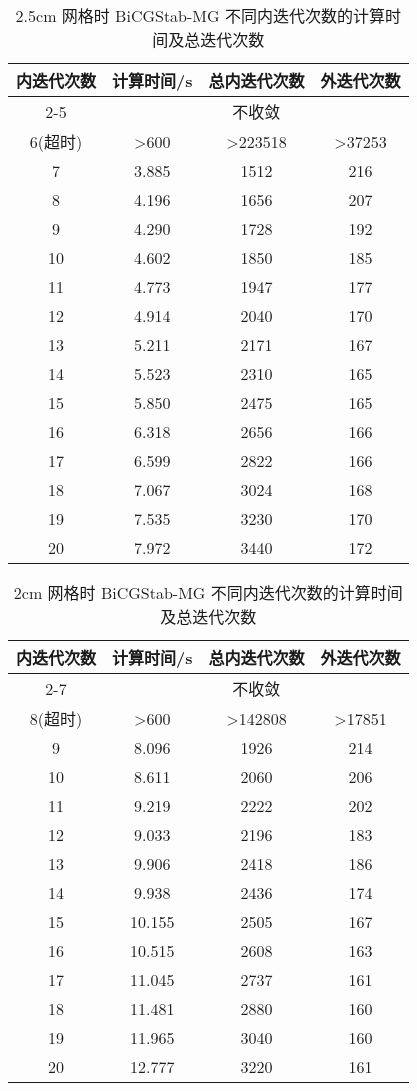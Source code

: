 \begin{datasheet}
\begin{table}
\centering
\caption{2.5cm 网格时 BiCGStab-MG 不同内迭代次数的计算时间及总迭代次数}
\label{tab:equsolve.iter.bicgstab-mg.2.5cm}
\begin{tabular}{cccc}
\toprule
内迭代次数 & 计算时间/s & 总内迭代次数 & 外迭代次数\\
\midrule
2-5 & \multicolumn{3}{c}{不收敛} \\ %
6(超时) & >600 & >223518 & >37253 \\ %
7 & 3.885 & 1512 & 216\\
8 & 4.196 & 1656 & 207\\
9 & 4.290 & 1728 & 192\\
10 & 4.602 & 1850 & 185\\
11 & 4.773 & 1947 & 177\\
12 & 4.914 & 2040 & 170\\
13 & 5.211 & 2171 & 167\\
14 & 5.523 & 2310 & 165\\
15 & 5.850 & 2475 & 165\\
16 & 6.318 & 2656 & 166\\
17 & 6.599 & 2822 & 166\\
18 & 7.067 & 3024 & 168\\
19 & 7.535 & 3230 & 170\\
20 & 7.972 & 3440 & 172\\
\bottomrule
\end{tabular}
\end{table}

\begin{table}
\centering
\caption{2cm 网格时 BiCGStab-MG 不同内迭代次数的计算时间及总迭代次数}
\label{tab:equsolve.iter.bicgstab-mg.2cm}
\begin{tabular}{cccc}
\toprule
内迭代次数 & 计算时间/s & 总内迭代次数 & 外迭代次数\\
\midrule
2-7 & \multicolumn{3}{c}{不收敛} \\ %
8(超时) & >600 & >142808 & >17851 \\ %
9 & 8.096 & 1926 & 214\\
10 & 8.611 & 2060 & 206\\
11 & 9.219 & 2222 & 202\\
12 & 9.033 & 2196 & 183\\
13 & 9.906 & 2418 & 186\\
14 & 9.938 & 2436 & 174\\
15 & 10.155 & 2505 & 167\\
16 & 10.515 & 2608 & 163\\
17 & 11.045 & 2737 & 161\\
18 & 11.481 & 2880 & 160\\
19 & 11.965 & 3040 & 160\\
20 & 12.777 & 3220 & 161\\
\bottomrule
\end{tabular}
\end{table}



\end{datasheet}
